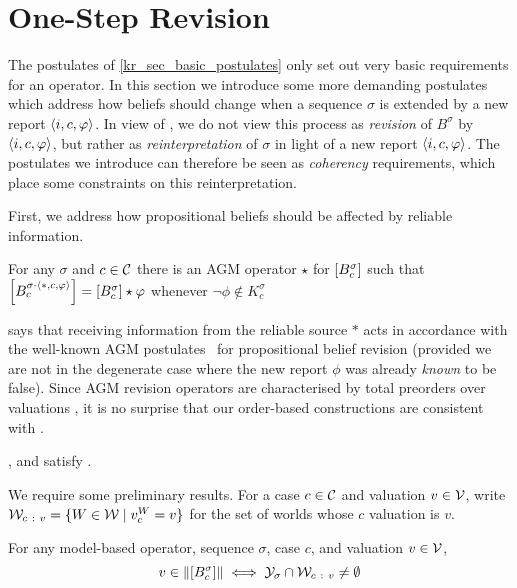 \section{One-Step Revision}
\label{kr_sec_one_step_postulates}

The postulates of \cref{kr_sec_basic_postulates} only set out very basic
requirements for an operator. In this section we introduce some more demanding
postulates which address how beliefs should change when a sequence $\sigma$ is
extended by a new report $\langle {i, c, \varphi} \rangle$.  In view of \rearr{}, we do not
view this process as \emph{revision} of $B^\sigma$ by $\langle {i, c, \varphi} \rangle$, but
rather as \emph{reinterpretation} of $\sigma$ in light of a new report
$\langle {i, c, \varphi} \rangle$. The postulates we introduce can therefore be seen as
\emph{coherency} requirements, which place some constraints on this
reinterpretation.

First, we address how propositional beliefs should be affected by reliable
information.

\begin{axiom}[\agm{}]
    For any $\sigma$ and $c \in \mathcal{C}$ there is an AGM operator $\star$
    for $\left[{B^\sigma_c}\right]$ such that $\left[{B^{\sigma \cdot
    \langle {\ast, c, \varphi} \rangle}_c}\right] = \left[{B^\sigma_c}\right] \star \varphi$ whenever
    $\neg\phi \notin K^\sigma_c$
\end{axiom}

\agm{} says that receiving information from the reliable source $\ast$ acts in
accordance with the well-known AGM postulates~\cite{alchourron1985logic} for propositional belief
revision (provided we are not in the degenerate case where the new report
$\phi$ was already \emph{known} to be false). Since AGM revision operators are
characterised by total preorders over valuations
\cite{grove1988two,katsuno_1991}, it is no surprise that our order-based
constructions are consistent with \agm{}.

\begin{proposition}
    \label{kr_prop_examples_satisfy_agm}
    \varbasedcond{}, \partbasedcond{} and \scorebasedop{}
    satisfy \agm{}.
\end{proposition}

We require some preliminary results. For a case $c \in \mathcal{C}$ and valuation $v \in
\mathcal{V}$, write $\mathcal{W}_{c\ :\ v} = \{W \in \mathcal{W} \mid v^W_c = v\}$ for the set of
worlds whose $c$ valuation is $v$.

\begin{lemma}
    \label{kr_lemma_model_based_models_of_proppart}
    For any model-based operator, sequence $\sigma$, case $c$, and valuation
    $v \in \mathcal{V}$,
    \[
        v \in \|{\left[{B^\sigma_c}\right]}\|
        \iff
        \mathcal{Y}_\sigma \cap \mathcal{W}_{c\ :\  v} \ne \emptyset
    \]
\end{lemma}


